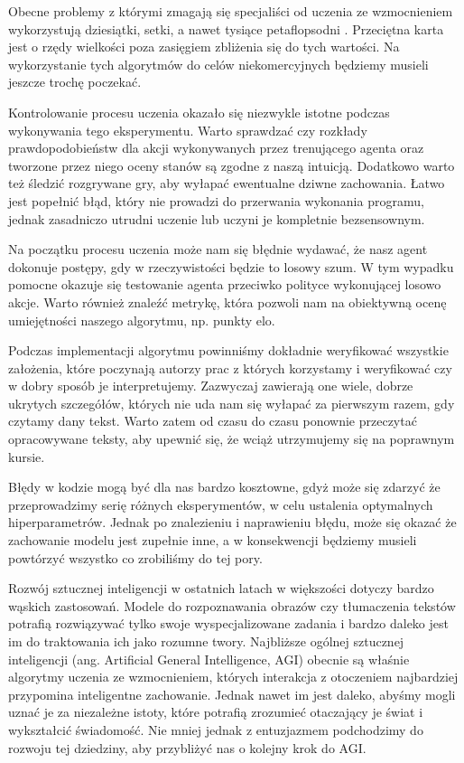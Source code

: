 \documentclass[licencjacka]{pracamgr}
\begin{document}
Obecne problemy z którymi zmagają się specjaliści od uczenia ze wzmocnieniem wykorzystują dziesiątki, setki, a nawet tysiące petaflopsodni \cite{openai-compute}. Przeciętna karta jest o rzędy wielkości poza zasięgiem zbliżenia się do tych wartości. Na wykorzystanie tych algorytmów do celów niekomercyjnych będziemy musieli jeszcze trochę poczekać.

Kontrolowanie procesu uczenia okazało się niezwykle istotne podczas wykonywania tego eksperymentu. Warto sprawdzać czy rozkłady prawdopodobieństw dla akcji wykonywanych przez trenującego agenta oraz tworzone przez niego oceny stanów są zgodne z naszą intuicją. Dodatkowo warto też śledzić rozgrywane gry, aby wyłapać ewentualne dziwne zachowania. Łatwo jest popełnić błąd, który nie prowadzi do przerwania wykonania programu, jednak zasadniczo utrudni uczenie lub uczyni je kompletnie bezsensownym.

Na początku procesu uczenia może nam się błędnie wydawać, że nasz agent dokonuje postępy, gdy w rzeczywistości będzie to losowy szum. W tym wypadku pomocne okazuje się testowanie agenta przeciwko polityce wykonującej losowo akcje. Warto również znaleźć metrykę, która pozwoli nam na obiektywną ocenę umiejętności naszego algorytmu, np. punkty elo.

Podczas implementacji algorytmu powinniśmy dokładnie weryfikować wszystkie założenia, które poczynają autorzy prac z których korzystamy i weryfikować czy w dobry sposób je interpretujemy. Zazwyczaj zawierają one wiele, dobrze ukrytych szczegółów, których nie uda nam się wyłapać za pierwszym razem, gdy czytamy dany tekst. Warto zatem od czasu do czasu ponownie przeczytać opracowywane teksty, aby upewnić się, że wciąż utrzymujemy się na poprawnym kursie.

Błędy w kodzie mogą być dla nas bardzo kosztowne, gdyż może się zdarzyć że przeprowadzimy serię różnych eksperymentów, w celu ustalenia optymalnych hiperparametrów. Jednak po znalezieniu i naprawieniu błędu, może się okazać że zachowanie modelu jest zupełnie inne, a w konsekwencji będziemy musieli powtórzyć wszystko co zrobiliśmy do tej pory.

Rozwój sztucznej inteligencji w ostatnich latach w większości dotyczy bardzo wąskich zastosowań. Modele do rozpoznawania obrazów czy tłumaczenia tekstów potrafią rozwiązywać tylko swoje wyspecjalizowane zadania i bardzo daleko jest im do traktowania ich jako rozumne twory. Najbliższe ogólnej sztucznej inteligencji (ang. Artificial General Intelligence, AGI) obecnie są właśnie algorytmy uczenia ze wzmocnieniem, których interakcja z otoczeniem najbardziej przypomina inteligentne zachowanie. Jednak nawet im jest daleko, abyśmy mogli uznać je za niezależne istoty, które potrafią zrozumieć otaczający je świat i wykształcić świadomość. Nie mniej jednak z entuzjazmem podchodzimy do rozwoju tej dziedziny, aby przybliżyć nas o kolejny krok do AGI.






\end{document}
